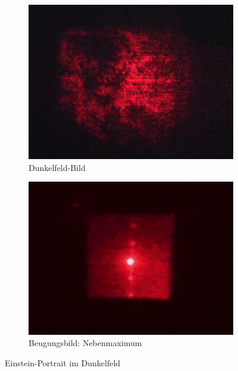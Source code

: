 \begin{figure}[p]
	\centering
	\begin{subfigure}{0.49\textwidth}
		\includegraphics[width=\textwidth]{data/optics/06_Einstein_Dunkel_Bild}
		\caption{Dunkelfeld-Bild}
	\end{subfigure}
	\begin{subfigure}{0.49\textwidth}
		\includegraphics[width=\textwidth]{data/optics/06_Einstein_Dunkel_Beugung}
		\caption{Beugungsbild: Nebenmaximum}		 \label{fig:Einstein_dunkel_BG}
	\end{subfigure}
	\caption{Einstein-Portrait im Dunkelfeld}	\label{fig:Einstein_dunkel}
	\vspace{-5em}
\end{figure}




